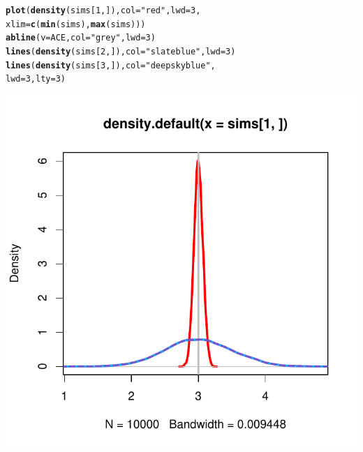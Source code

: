 \documentclass[12 pt]{article}\usepackage[]{graphicx}\usepackage[]{color}
\makeatletter
\def\maxwidth{ %
  \ifdim\Gin@nat@width>\linewidth
    \linewidth
  \else
    \Gin@nat@width
  \fi
}
\newcommand{\hlnum}[1]{\textcolor[rgb]{0.686,0.059,0.569}{#1}}%
\newcommand{\hlstr}[1]{\textcolor[rgb]{0.192,0.494,0.8}{#1}}%
\newcommand{\hlstd}[1]{\textcolor[rgb]{0.345,0.345,0.345}{#1}}%
\newcommand{\hlkwc}[1]{\textcolor[rgb]{0.333,0.667,0.333}{#1}}%
\newcommand{\hlkwd}[1]{\textcolor[rgb]{0.737,0.353,0.396}{\textbf{#1}}}%
\newenvironment{kframe}{%
 \def\at@end@of@kframe{}%
 \ifinner\ifhmode%
  \def\at@end@of@kframe{\end{minipage}}%
  \begin{minipage}{\columnwidth}%
 \fi\fi%
 \def\FrameCommand##1{\hskip\@totalleftmargin \hskip-\fboxsep
 \colorbox{shadecolor}{##1}\hskip-\fboxsep
     \hskip-\linewidth \hskip-\@totalleftmargin \hskip\columnwidth}%
 \MakeFramed {\advance\hsize-\width
   \@totalleftmargin\z@ \linewidth\hsize
   \@setminipage}}%
 {\par\unskip\endMakeFramed%
 \at@end@of@kframe}
\newenvironment{knitrout}{}{} %
\makeatother
\begin{document}
\begin{knitrout}
\color{fgcolor}\begin{kframe}
\begin{alltt}
\hlkwd{plot}\hlstd{(}\hlkwd{density}\hlstd{(sims[}\hlnum{1}\hlstd{, ]),} \hlkwc{col} \hlstd{=} \hlstr{"red"}\hlstd{,} \hlkwc{lwd} \hlstd{=} \hlnum{3}\hlstd{,}
    \hlkwc{xlim} \hlstd{=} \hlkwd{c}\hlstd{(}\hlkwd{min}\hlstd{(sims),} \hlkwd{max}\hlstd{(sims)))}
\hlkwd{abline}\hlstd{(}\hlkwc{v} \hlstd{= ACE,} \hlkwc{col} \hlstd{=} \hlstr{"grey"}\hlstd{,} \hlkwc{lwd} \hlstd{=} \hlnum{3}\hlstd{)}
\hlkwd{lines}\hlstd{(}\hlkwd{density}\hlstd{(sims[}\hlnum{2}\hlstd{, ]),} \hlkwc{col} \hlstd{=} \hlstr{"slateblue"}\hlstd{,} \hlkwc{lwd} \hlstd{=} \hlnum{3}\hlstd{)}
\hlkwd{lines}\hlstd{(}\hlkwd{density}\hlstd{(sims[}\hlnum{3}\hlstd{, ]),} \hlkwc{col} \hlstd{=} \hlstr{"deepskyblue"}\hlstd{,}
    \hlkwc{lwd} \hlstd{=} \hlnum{3}\hlstd{,} \hlkwc{lty} \hlstd{=} \hlnum{3}\hlstd{)}
\end{alltt}
\end{kframe}

{\centering \includegraphics[width=\maxwidth]{figure/minimal-unnamed-chunk-20-1} 

}



\end{knitrout}
\end{document}
